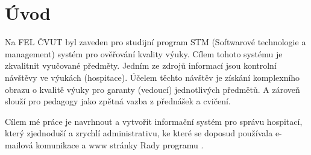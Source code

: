\chapter{Úvod}

Na FEL ČVUT byl zaveden pro studijní program STM (Softwarové technologie a management) systém pro ověřování kvality výuky. Cílem tohoto systému je zkvalitnit vyučované předměty. Jedním ze zdrojů informací jsou kontrolní návštěvy ve výukách (hospitace). Účelem těchto návštěv je získání komplexního obrazu o kvalitě výuky pro garanty (vedoucí) jednotlivých předmětů. A zároveň slouží pro pedagogy jako zpětná vazba z přednášek a cvičení.

Cílem mé práce je navrhnout a vytvořit informační systém pro správu hospitací, který zjednoduší a zrychlí administrativu, ke které se doposud používala e-mailová komunikace a www stránky Rady programu \cite{kvalitavyukyweb}. 


